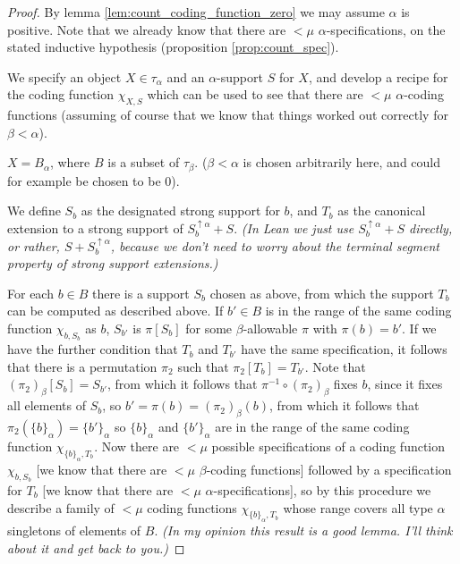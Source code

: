 \documentclass[112pt]{article}
\theoremstyle{definition}
\theoremstyle{remark}
\newcommand{\rk}[1]{{\color{blue}\sl #1}}
\begin{document}
\begin{proof}

{By lemma \ref{lem:count_coding_function_zero} we may assume $\alpha$ is positive.}
Note that we already know that there are $<\mu$ $\alpha$-specifications, on the stated inductive hypothesis {(proposition \ref{prop:count_spec})}.

We specify an object $X\in \tau_\alpha$ and an $\alpha$-support $S$ for $X$, and develop a recipe for the coding function $\chi_{X,S}$ which can be used to see that there are $<\mu$ $\alpha$-coding functions (assuming of course that we know that things worked out correctly for $\beta<\alpha$).


$X = B_\alpha$, where $B$ is a subset of $\tau_\beta$.  ($\beta<\alpha$ is chosen arbitrarily here{, and could for example be chosen to be 0}).

We define $S_b$ as the designated strong support for $b$, and $T_b$ as the canonical extension to a strong support of $S_b^{\uparrow \alpha}+S$. \rk{(In Lean we just use $S_b^{\uparrow \alpha}+S$ directly, or rather, $S+S_b^{\uparrow \alpha}$, because we don't need to worry about the terminal segment property of strong support extensions.)}



For each $b \in B$ there is a support $S_b$ chosen as above, from which the support $T_b$ can be computed as described above.  If $b' \in B$ is in the range of the same coding function $\chi_{b,S_b}$ as $b$, $S_{b'}$ is $\pi[S_{b}]$ for some $\beta$-allowable $\pi$ with $\pi(b) = b'$.
If we have the further condition that $T_b$ and $T_{b'}$ have the same specification, it follows that there is a permutation $\pi_2$ such that $\pi_2[T_b] = T_{b'}$.  Note that $(\pi_2)_\beta[S_b]=S_{b'}$, from which it follows that $\pi^{-1} \circ (\pi_2)_\beta$ fixes $b$, since it fixes all elements of $S_b$, so $b'=\pi(b) = (\pi_2)_\beta(b)$, from which it follows
that $\pi_2(\{b\}_\alpha) = \{b'\}_\alpha$ so $\{b\}_\alpha$ and $\{b'\}_\alpha$ are in the range of the same coding function $\chi_{\{b\}_\alpha,T_b}$.  Now there are $<\mu$ possible specifications of a coding function $\chi_{b,S_b}$ [we know that there are $<\mu$ $\beta$-coding functions]  followed by a specification for $T_b$ [we know that there are $<\mu$ $\alpha$-specifications], so by this procedure we describe a family of $<\mu$ coding functions $\chi_{\{b\}_\alpha,T_b}$ whose range covers all type $\alpha$ singletons of elements of $B$. \rk{(In my opinion this result is a good lemma. I'll think about it and get back to you.)}



\end{proof}
\end{document}
